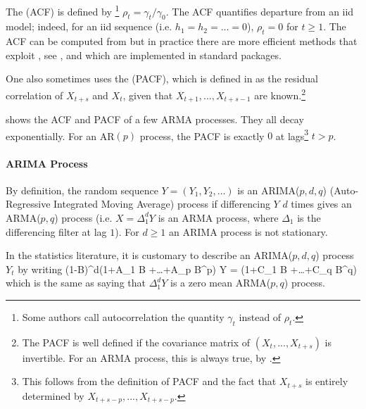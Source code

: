 The  (ACF)
\label{def-acf}
is defined by%
\footnote{Some authors call autocorrelation the quantity
$\gamma_t$ instead of $\rho_t$.} $ \rho_t = \gamma_t /
\gamma_0$. The ACF quantifies departure from an iid model;
indeed, for an iid sequence (i.e. $h_1=h_2=...=0$), $\rho_t=0$
for $t\geq 1$. The ACF can be computed from 
but in practice there are more efficient methods that exploit
, see \cite{weber-ts}, and which are
implemented in standard packages.
\begin{figure}
\begin{center}
\end{center}
 \label{fig-arma-acf}
\end{figure}
One also sometimes uses the  (PACF), which
is defined in  as  the residual
correlation of $X_{t+s}$ and $X_t$,  given that
$X_{t+1},...,X_{t+s-1}$ are known.\footnote{The PACF
is well defined if the covariance matrix of
$(X_{t},...,X_{t+s})$ is invertible. For an ARMA
process, this is always true, by
.}

 shows the ACF and PACF of a few ARMA
processes. They all decay exponentially. For an AR$(p)$
process, the PACF is exactly $0$ at lags\footnote{This follows
from the definition of PACF and the fact that $X_{t+s}$ is
entirely determined by $X_{t+s-p},...,X_{t+s-p}$.} $t>p$.

\paragraph{ARIMA Process} By definition, the random
sequence $Y=(Y_1,Y_2,\ldots)$ is an ARIMA($p,d,q$)
(Auto-Regressive Integrated Moving Average)
process if differencing $Y$ $d$ times gives an
ARMA($p,q$) process (i.e. $X=\Delta_1^d Y$ is an ARMA
process, where $\Delta_1$ is the differencing filter
at lag $1$). For $d \geq 1$ an ARIMA process is not
stationary.

In the statistics literature, it is customary to
describe an ARIMA($p,d,q$) process $Y_t$ by writing
 \be
 (1-B)^d(1+A_1 B +\ldots+A_p B^p) Y = (1+C_1 B +\ldots+C_q
 B^q) \epsilon
 \ee
 which is the same as saying that $\Delta_1^d Y$ is a
 zero mean ARMA($p,q$) process.

